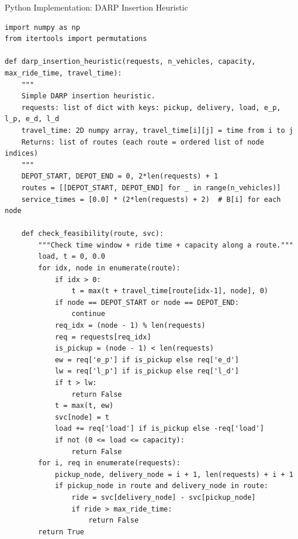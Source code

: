 \documentclass[aspectratio=169,10pt]{beamer}
\begin{document}
\begin{frame}[fragile]{Python Implementation: DARP Insertion Heuristic}
\begin{lstlisting}[caption={DARP insertion heuristic skeleton (Python 3)},
                   label=lst:darp_insertion]
import numpy as np
from itertools import permutations

def darp_insertion_heuristic(requests, n_vehicles, capacity, max_ride_time, travel_time):
    """
    Simple DARP insertion heuristic.
    requests: list of dict with keys: pickup, delivery, load, e_p, l_p, e_d, l_d
    travel_time: 2D numpy array, travel_time[i][j] = time from i to j
    Returns: list of routes (each route = ordered list of node indices)
    """
    DEPOT_START, DEPOT_END = 0, 2*len(requests) + 1
    routes = [[DEPOT_START, DEPOT_END] for _ in range(n_vehicles)]
    service_times = [0.0] * (2*len(requests) + 2)  # B[i] for each node

    def check_feasibility(route, svc):
        """Check time window + ride time + capacity along a route."""
        load, t = 0, 0.0
        for idx, node in enumerate(route):
            if idx > 0:
                t = max(t + travel_time[route[idx-1], node], 0)
            if node == DEPOT_START or node == DEPOT_END:
                continue
            req_idx = (node - 1) % len(requests)
            req = requests[req_idx]
            is_pickup = (node - 1) < len(requests)
            ew = req['e_p'] if is_pickup else req['e_d']
            lw = req['l_p'] if is_pickup else req['l_d']
            if t > lw:
                return False
            t = max(t, ew)
            svc[node] = t
            load += req['load'] if is_pickup else -req['load']
            if not (0 <= load <= capacity):
                return False
        for i, req in enumerate(requests):
            pickup_node, delivery_node = i + 1, len(requests) + i + 1
            if pickup_node in route and delivery_node in route:
                ride = svc[delivery_node] - svc[pickup_node]
                if ride > max_ride_time:
                    return False
        return True


\end{lstlisting}
\end{frame}
\end{document}
